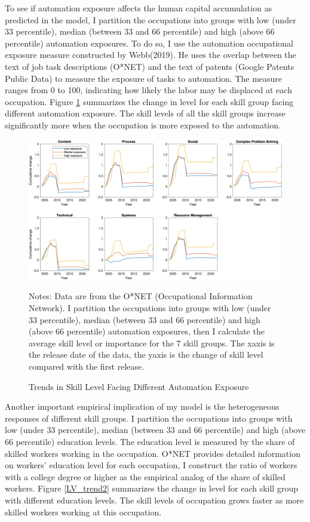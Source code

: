 \documentclass[12pt]{article}
\begin{document}
To see if automation exposure affects the human capital accumulation as predicted in the model, I partition the occupations into groups with low (under 33 percentile), median (between 33 and 66 percentile) and high (above 66 percentile) automation exposures. To do so, I use the automation occupational exposure measure constructed by Webb(2019)\nocite{Webb2019}. He uses the overlap between the text of job task descriptions (O*NET) and the text of patents (Google Patents Public Data) to measure the exposure of tasks to automation. The measure ranges from 0 to 100, indicating how likely the labor may be displaced at each occupation. Figure \ref{LV_trend1} summarizes the change in level for each skill group facing different automation exposure. The skill levels of all the skill groups increase significantly more when the occupation is more exposed to the automation. 

\begin{figure}[h!]
\includegraphics[width = \textwidth]{LV_trend1}
\caption{Trends in Skill Level Facing Different Automation Exposure}
\label{LV_trend1}
{\scriptsize Notes: Data are from the O*NET (Occupational Information Network). I partition the occupations into groups with low (under 33 percentile), median (between 33 and 66 percentile) and high (above 66 percentile) automation exposures, then I calculate the average skill level or importance for the 7 skill groups. The xaxis is the release date of the data, the yaxis is the change of skill level compared with the first release. }
\end{figure}

Another important empirical implication of my model is the heterogeneous responses of different skill groups. I partition the occupations into groups with low (under 33 percentile), median (between 33 and 66 percentile) and high (above 66 percentile) education levels. The education level is measured by the share of skilled workers working in the occupation. O*NET provides detailed information on workers' education level for each occupation, I construct the ratio of workers with a college degree or higher as the empirical analog of the share of skilled workers. Figure \ref{LV_trend2} summarizes the change in level for each skill group with different education levels. The skill levels of occupation grows faster as more skilled workers working at this occupation. 
\end{document}
